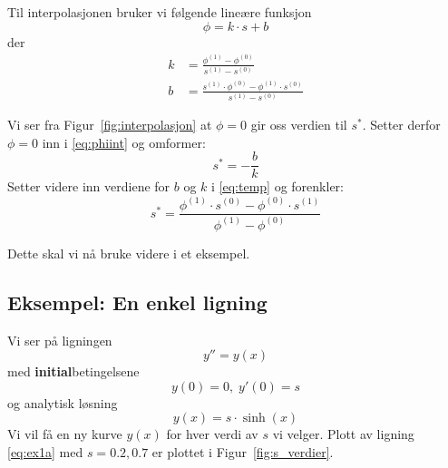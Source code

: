 Til interpolasjonen bruker vi følgende lineære funksjon
\begin{equation}
  \phi = k \cdot s + b \label{eq:phiint}
\end{equation}
der
\begin{align}
  k &= \frac{\phi^{(1)} - \phi^{(0)}}{s^{(1)}-s^{(0)}} \\
  b &= \frac{s^{(1)}\cdot\phi^{(0)} - \phi^{(1)}\cdot s^{(0)}}{s^{(1)}-s^{(0)}}
\end{align}

Vi ser fra Figur~\ref{fig:interpolasjon} at $\phi=0$ gir oss verdien til $s^*$. Setter derfor $\phi=0$ inn i \eqref{eq:phiint} og omformer:
\begin{equation}
  s^* = - \frac{b}{k} \label{eq:temp}
\end{equation}
Setter videre inn verdiene for $b$ og $k$ i \eqref{eq:temp} og forenkler:
\begin{equation}
  s^* = \dfrac{\phi^{(1)}\cdot s^{(0)} - \phi^{(0)}\cdot s^{(1)}}{\phi^{(1)} - \phi^{(0)}}\label{eq:scorr}
\end{equation}

Dette skal vi nå bruke videre i et eksempel.


\clearpage

\subsection{Eksempel: En enkel ligning} %
\label{sub:en_enkel_ligning}

Vi ser på ligningen
\begin{equation}
  y'' = y(x) \label{eq:ex1eq}
\end{equation}
med \textbf{initial}betingelsene
\begin{equation}
  y(0) = 0, \; y'(0) = s \tag{ib} \label{eq:ex1b}
\end{equation}
og analytisk løsning
\begin{equation}
  y(x) = s\cdot \sinh(x) \tag{a} \label{eq:ex1a}
\end{equation}
Vi vil få en ny kurve $y(x)$ for hver verdi av $s$ vi velger. Plott av ligning \eqref{eq:ex1a} med $s=0.2, 0.7$ er plottet i Figur~\ref{fig:s_verdier}.

